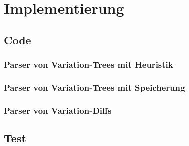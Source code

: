 \chapter{Implementierung}
\section{Code}

\subsection{Parser von Variation-Trees mit Heuristik}

\subsection{Parser von Variation-Trees mit Speicherung}

\subsection{Parser von Variation-Diffs}

\section{Test}
